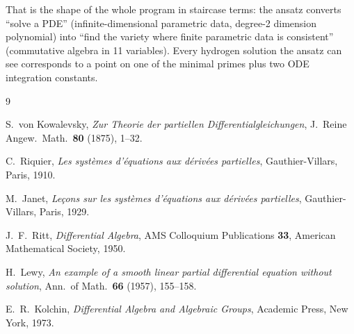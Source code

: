 \documentclass[11pt]{article}
\begin{document}
That is the shape of the whole program in staircase terms: the ansatz
converts ``solve a PDE'' (infinite-dimensional parametric data, degree-2
dimension polynomial) into ``find the variety where finite parametric
data is consistent'' (commutative algebra in 11 variables).  Every
hydrogen solution the ansatz can see corresponds to a point on one of the
minimal primes plus two ODE integration constants.

\begin{thebibliography}{9}

 S.~von Kowalevsky,
\emph{Zur Theorie der partiellen Differentialgleichungen},
J.\ Reine Angew.\ Math.\ \textbf{80} (1875), 1--32.

 C.~Riquier,
\emph{Les syst\`emes d'\'equations aux d\'eriv\'ees partielles},
Gauthier-Villars, Paris, 1910.

 M.~Janet,
\emph{Le\c{c}ons sur les syst\`emes d'\'equations aux d\'eriv\'ees
partielles}, Gauthier-Villars, Paris, 1929.

 J.~F.~Ritt,
\emph{Differential Algebra},
AMS Colloquium Publications \textbf{33}, American Mathematical Society,
1950.

 H.~Lewy,
\emph{An example of a smooth linear partial differential equation without
solution}, Ann.\ of Math.\ \textbf{66} (1957), 155--158.

 E.~R.~Kolchin,
\emph{Differential Algebra and Algebraic Groups},
Academic Press, New York, 1973.

\end{thebibliography}

\bigskip
{}
\end{document}
